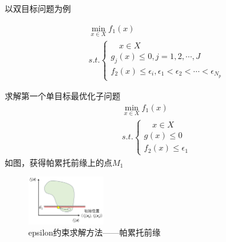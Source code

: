 \begin{example}
    以双目标问题为例

    \begin{equation}
        \begin{aligned}
             & \min_{x \in X} f_1(x)                                                            \\
             & s.t.   \begin{cases}
                          \quad x \in X                   \\
                          g_j(x) \leq 0, j = 1,2,\cdots,J \\
                          f_2(x) \leq \epsilon_i , \epsilon_1 < \epsilon_2 < \cdots < \epsilon_{N_p}
                      \end{cases}
        \end{aligned}
    \end{equation}

    求解第一个单目标最优化子问题
    \begin{equation}
        \begin{aligned}
             & \min_{x \in X} f_1(x)        \\
             & s.t.   \begin{cases}
                          \quad x \in X \\
                          g(x) \leq 0   \\
                          f_2(x) \leq \epsilon_1
                      \end{cases}
        \end{aligned}
    \end{equation}
    如图，获得帕累托前缘上的点$M_1$
    \begin{figure}[ht]
        \centering
        \includegraphics[width=0.3\textwidth]{pic/2.7.9.png}
        \caption{epsilon约束求解方法——帕累托前缘}
    \end{figure}


\end{example}
